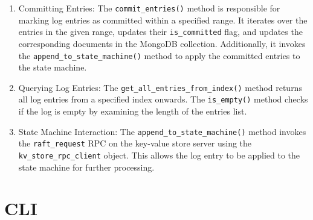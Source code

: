 \documentclass{article}
\begin{document}
\begin{enumerate}
\begin{enumerate}
		\item Committing Entries: The \texttt{commit\_entries()} method is responsible for marking log entries as committed within a specified range. It iterates over the entries in the given range, updates their \texttt{is\_committed} flag, and updates the corresponding documents in the MongoDB collection. Additionally, it invokes the \texttt{append\_to\_state\_machine()} method to apply the committed entries to the state machine.
		\item Querying Log Entries: The \texttt{get\_all\_entries\_from\_index()} method returns all log entries from a specified index onwards. The \texttt{is\_empty()} method checks if the log is empty by examining the length of the entries list.
		\item State Machine Interaction: The \texttt{append\_to\_state\_machine()} method invokes the \texttt{raft\_request} RPC on the key-value store server using the \texttt{kv\_store\_rpc\_client} object. This allows the log entry to be applied to the state machine for further processing.
	\end{enumerate}
\end{enumerate}


\section{CLI}


% 
% 
\end{document}

